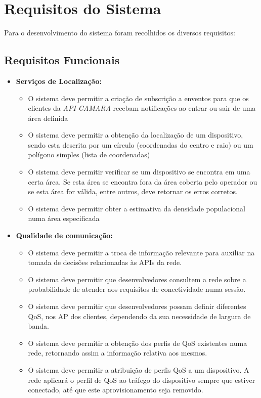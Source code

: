 \chapter{Requisitos do Sistema}

Para o desenvolvimento do sistema foram recolhidos os diversos requisitos:

\section{Requisitos Funcionais}

\begin{itemize} \item \textbf{Serviços de Localização:} \begin{itemize}

		      \item O sistema deve permitir a criação de subscrição a enventos para que os
		            clientes da \emph{API CAMARA} recebam notificações ao entrar ou sair de uma
		            área definida \item O sistema deve permitir a obtenção da localização de um
		            dispositivo, sendo esta descrita por um círculo (coordenadas do centro e
		            raio) ou um polígono simples (lista de coordenadas) \item O sistema deve
		            permitir verificar se um dispositivo se encontra em uma certa área. Se esta
		            área se encontra fora da área coberta pelo operador ou se esta área for
		            válida, entre outros, deve retornar os erros corretos. \item O sistema deve
		            permitir obter a estimativa da densidade populacional numa área especificada
	      \end{itemize}

	\item \textbf{Qualidade de comunicação:} \begin{itemize}

		      \item O sistema deve permitir a troca de informação relevante para auxiliar
		            na tomada de decisões relacionadas às APIs da rede. \item O sistema deve
		            permitir que desenvolvedores consultem a rede sobre a probabilidade de
		            atender aos requisitos de conectividade numa sessão. \item O sistema deve
		            permitir que desenvolvedores possam definir diferentes QoS, nos AP dos
		            clientes, dependendo da sua necessidade de largura de banda. \item O
		            sistema deve permitir a obtenção dos perfis de QoS existentes numa rede,
		            retornando assim a informação relativa aos mesmos. \item O sistema deve
		            permitir a atribuição de perfis QoS a um dispositivo. A rede aplicará o
		            perfil de QoS ao tráfego do dispositivo sempre que estiver conectado, até
		            que este aprovisionamento seja removido. \end{itemize}


\end{itemize}
